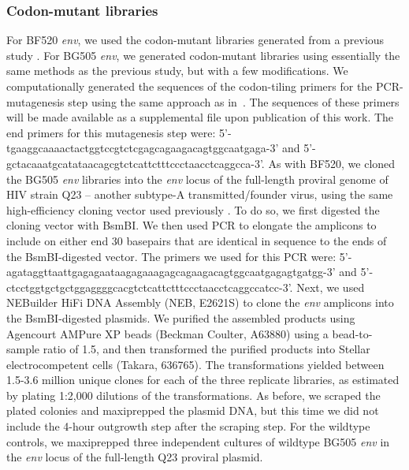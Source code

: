 \documentclass[9pt,lineno]{elife}
\begin{document}
\subsubsection*{Codon-mutant libraries}
For BF520 \textit{env}, we used the codon-mutant libraries generated from a previous study \cite{dingens2017comprehensive}.
For BG505 \textit{env}, we generated codon-mutant libraries using essentially the same methods as the previous study, but with a few modifications.
We computationally generated the sequences of the codon-tiling primers for the PCR-mutagenesis step using the same approach as in~\cite{dingens2017comprehensive}.
The sequences of these primers will be made available as a supplemental file upon publication of this work.
The end primers for this mutagenesis step were: 5'-tgaaggcaaaactactggtccgtctcgagcagaagacagtggcaatgaga-3' and 5'-gctacaaatgcatataacagcgtctcattctttccctaacctcaggcca-3'.
As with BF520, we cloned the BG505 \textit{env} libraries into the \textit{env} locus of the full-length proviral genome of HIV strain Q23 \cite{poss1999variants} -- another subtype-A transmitted/founder virus, using the same high-efficiency cloning vector used previously \cite{dingens2017comprehensive}.
To do so, we first digested the cloning vector with BsmBI.
We then used PCR to elongate the amplicons to include on either end 30 basepairs that are identical in sequence to the ends of the BsmBI-digested vector.
The primers we used for this PCR were:
5'-agataggttaattgagagaataagagaaagagcagaagacagtggcaatgagagtgatgg-3' and 5'-ctcctggtgctgctggaggggcacgtctcattctttccctaacctcaggccatcc-3'.
Next, we used NEBuilder HiFi DNA Assembly (NEB, E2621S) to clone the \textit{env} amplicons into the BsmBI-digested plasmids.
We purified the assembled products using Agencourt AMPure XP beads (Beckman Coulter, A63880) using a bead-to-sample ratio of 1.5, and then transformed the purified products into Stellar electrocompetent cells (Takara, 636765).
The transformations yielded between 1.5-3.6 million unique clones for each of the three replicate libraries, as estimated by plating 1:2,000 dilutions of the transformations.
As before, we scraped the plated colonies and maxiprepped the plasmid DNA, but this time we did not include the 4-hour outgrowth step after the scraping step.
For the wildtype controls, we maxiprepped three independent cultures of wildtype BG505 \textit{env} in the \textit{env} locus of the full-length Q23 proviral plasmid.
\end{document}
